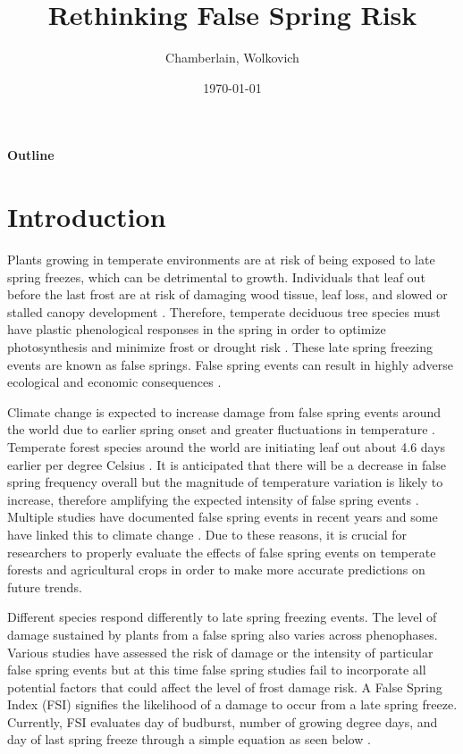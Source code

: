 \documentclass{article}\usepackage[]{graphicx}\usepackage[]{color}
\begin{document}
\title{Rethinking False Spring Risk}
\author{Chamberlain, Wolkovich}
\date{\today}
\maketitle 

\renewcommand{\thetable}{\arabic{table}}
\renewcommand{\thefigure}{\arabic{figure}}
\renewcommand{\labelitemi}{$-$}

\begin{center}
\LARGE\textbf{Outline}
\end{center}
\section{Introduction}
Plants growing in temperate environments are at risk of being exposed to late spring freezes, which can be detrimental to growth. Individuals that leaf out before the last frost are at risk of damaging wood tissue, leaf loss, and slowed or stalled canopy development \citep{Gu2008, Hufkens2012}. Therefore, temperate deciduous tree species must have plastic phenological responses in the spring in order to optimize photosynthesis and minimize frost or drought risk \citep{Polgar2011}. These late spring freezing events are known as false springs. False spring events can result in highly adverse ecological and economic consequences \citep{Ault2013, Knudson2012}.

Climate change is expected to increase damage from false spring events around the world due to earlier spring onset and greater fluctuations in temperature \citep{Martin2010, Inouye2008, Cannell1986}. Temperate forest species around the world are initiating leaf out about 4.6 days earlier per degree Celsius \citep{Polgar2014, Wolkovich2012}. It is anticipated that there will be a decrease in false spring frequency overall but the magnitude of temperature variation is likely to increase, therefore amplifying the expected intensity of false spring events \citep{Allstadt2015, Kodra2011}. Multiple studies have documented false spring events in recent years \citep{Augspurger2013, Knudson2012, Augspurger2009, Gu2008} and some have linked this to climate change \citep{Muffler2016, Xin2016, Allstadt2015, Ault2013}. Due to these reasons, it is crucial for researchers to properly evaluate the effects of false spring events on temperate forests and agricultural crops in order to make more accurate predictions on future trends.

Different species respond differently to late spring freezing events. The level of damage sustained by plants from a false spring also varies across phenophases. Various studies have assessed the risk of damage or the intensity of particular false spring events but at this time false spring studies fail to incorporate all potential factors that could affect the level of frost damage risk. A False Spring Index (FSI) signifies the likelihood of a damage to occur from a late spring freeze. Currently, FSI evaluates day of budburst, number of growing degree days, and day of last spring freeze through a simple equation as seen below \citep{Marino2011}. 
\end{document}
